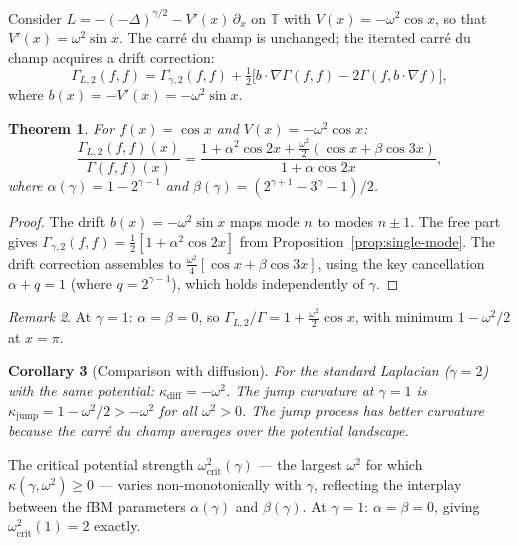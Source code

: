 \documentclass[11pt,a4paper]{article}
\theoremstyle{plain}
\newtheorem{theorem}{Theorem}[section]
\newtheorem{corollary}[theorem]{Corollary}
\theoremstyle{definition}
\theoremstyle{remark}
\newtheorem{remark}[theorem]{Remark}
\newcommand{\T}{\mathbb{T}}
\begin{document}
Consider $L = -(-\Delta)^{\gamma/2} - V'(x)\,\partial_x$ on $\T$
with $V(x) = -\omega^2\cos x$, so that
$V'(x) = \omega^2\sin x$. The carr\'e du champ is unchanged;
the iterated carr\'e du champ acquires a drift correction:
\begin{equation}\label{eq:G2-drift}
  \Gamma_{L,2}(f,f) = \Gamma_{\gamma,2}(f,f)
  + \tfrac{1}{2}\bigl[
    b \cdot \nabla\Gamma(f,f) - 2\Gamma(f, b \cdot \nabla f)
  \bigr],
\end{equation}
where $b(x) = -V'(x) = -\omega^2\sin x$.

\begin{theorem}\label{thm:potential}
For $f(x) = \cos x$ and $V(x) = -\omega^2\cos x$:
\begin{equation}\label{eq:G2-ratio-potential}
  \frac{\Gamma_{L,2}(f,f)(x)}{\Gamma(f,f)(x)}
  = \frac{1 + \alpha^2\cos 2x + \tfrac{\omega^2}{2}(\cos x + \beta\cos 3x)}
         {1 + \alpha\cos 2x},
\end{equation}
where
$\alpha(\gamma) = 1 - 2^{\gamma-1}$ and
$\beta(\gamma) = (2^{\gamma+1} - 3^\gamma - 1)/2$.
\end{theorem}

\begin{proof}
The drift $b(x) = -\omega^2\sin x$ maps mode $n$ to modes $n \pm 1$.
The free part gives
$\Gamma_{\gamma,2}(f,f) = \frac{1}{2}[1 + \alpha^2\cos 2x]$
from Proposition~\ref{prop:single-mode}.
The drift correction assembles to
$\frac{\omega^2}{4}[\cos x + \beta\cos 3x]$,
using the key cancellation $\alpha + q = 1$ (where $q = 2^{\gamma-1}$),
which holds independently of $\gamma$.
\end{proof}

\begin{remark}
At $\gamma = 1$: $\alpha = \beta = 0$, so
$\Gamma_{L,2}/\Gamma = 1 + \frac{\omega^2}{2}\cos x$,
with minimum $1 - \omega^2/2$ at $x = \pi$.
\end{remark}

\begin{corollary}[Comparison with diffusion]\label{cor:comparison}
For the standard Laplacian ($\gamma = 2$) with the same potential:
$\kappa_{\mathrm{diff}} = -\omega^2$.
The jump curvature at $\gamma = 1$ is
$\kappa_{\mathrm{jump}} = 1 - \omega^2/2 > -\omega^2$
for all $\omega^2 > 0$. The jump process has better curvature because
the carr\'e du champ averages over the potential landscape.
\end{corollary}

The critical potential strength $\omega^2_{\mathrm{crit}}(\gamma)$
--- the largest $\omega^2$ for which $\kappa(\gamma,\omega^2) \geq 0$
--- varies non-monotonically with $\gamma$, reflecting the interplay
between the fBM parameters $\alpha(\gamma)$ and $\beta(\gamma)$.
At $\gamma = 1$: $\alpha = \beta = 0$, giving
$\omega^2_{\mathrm{crit}}(1) = 2$ exactly.
\end{document}
